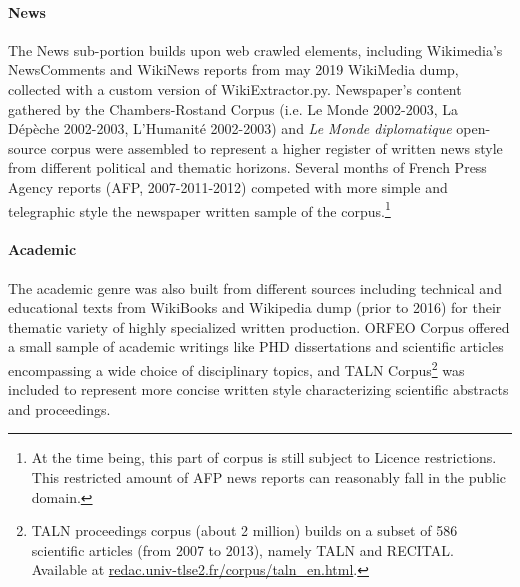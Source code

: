 \paragraph{\Cabernet News} \label{subsec:DescribeCaBeRnetNews}
The News sub-portion builds upon web crawled elements, including Wikimedia's NewsComments and WikiNews reports from may 2019 WikiMedia dump, collected with a custom version of WikiExtractor.py.
Newspaper's content gathered by the Chambers-Rostand Corpus (i.e. Le Monde 2002-2003, La Dépèche 2002-2003, L'Humanité 2002-2003) and \textit{Le Monde diplomatique} open-source corpus were assembled to represent a higher register of written news style from different political and thematic horizons.
Several months of French Press Agency reports (AFP, 2007-2011-2012) competed with more simple and telegraphic style the newspaper written sample of the corpus.\footnote{At the time being, this part of \Cabernet corpus is still subject to Licence restrictions. This restricted amount of AFP news reports can reasonably fall in the public domain.}

\paragraph{\Cabernet Academic} \label{subsec:DescribeCaBeRnetAcad}
The academic genre was also built from different sources including technical and educational texts from WikiBooks and Wikipedia dump (prior to 2016) for their thematic variety of highly specialized written production. \textsc{ORFEO} Corpus offered a small sample of academic writings like PHD dissertations and scientific articles encompassing a wide choice of disciplinary topics, and TALN Corpus\footnote{TALN proceedings corpus (about 2 million) builds on a subset of 586 scientific articles (from 2007 to 2013), namely TALN and RECITAL. Available at \url{redac.univ-tlse2.fr/corpus/taln_en.html}.} was included to represent more concise written style characterizing scientific abstracts and proceedings.

